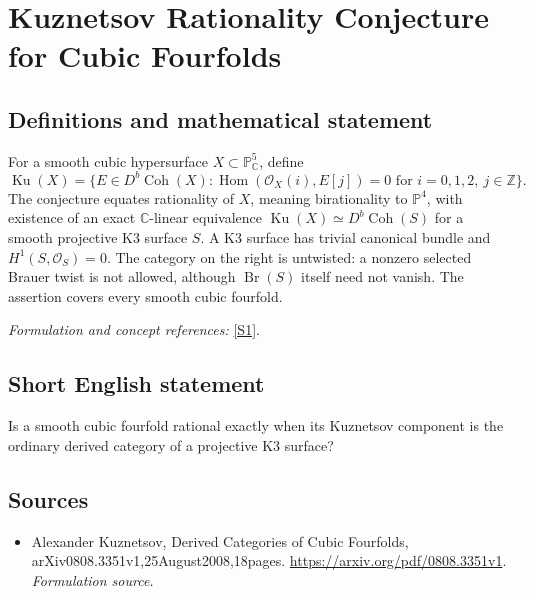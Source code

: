 \documentclass[11pt]{article}
\begin{document}
\section*{\texorpdfstring{Kuznetsov Rationality Conjecture for Cubic Fourfolds}{Kuznetsov Rationality Conjecture for Cubic Fourfolds}}\label{267}
\subsection{Definitions and mathematical statement}
For a smooth cubic hypersurface $X\subset{\mathbb{P}}^5_{{\mathbb{C}}}$, define
\[
 \operatorname{Ku}(X)=\{E\in D^b\operatorname{Coh}(X):
 \operatorname{Hom}(\mathcal O_X(i),E[j])=0\text{ for }i=0,1,2,\ j\in{\mathbb{Z}}\}.
\]
The conjecture equates rationality of $X$, meaning birationality to ${\mathbb{P}}^4$, with existence of an exact ${\mathbb{C}}$-linear equivalence
$\operatorname{Ku}(X)\simeq D^b\operatorname{Coh}(S)$ for a smooth projective K3 surface $S$. A K3 surface has trivial canonical bundle and $H^1(S,\mathcal O_S)=0$. The category on the right is untwisted: a nonzero selected Brauer twist is not allowed, although $\operatorname{Br}(S)$ itself need not vanish. The assertion covers every smooth cubic fourfold.
\par\smallskip\textit{Formulation and concept references:} \href{https://arxiv.org/pdf/0808.3351v1}{[S1]}.

\subsection{Short English statement}
Is a smooth cubic fourfold rational exactly when its Kuznetsov component is the ordinary derived category of a projective K3 surface?
\subsection{Sources}
\begin{itemize}
\item[S1]Alexander Kuznetsov, Derived Categories of Cubic Fourfolds, arXiv0808.3351v1,25August2008,18pages.
\url{https://arxiv.org/pdf/0808.3351v1}.
\textit{Formulation source.}
\end{itemize}
\end{document}
